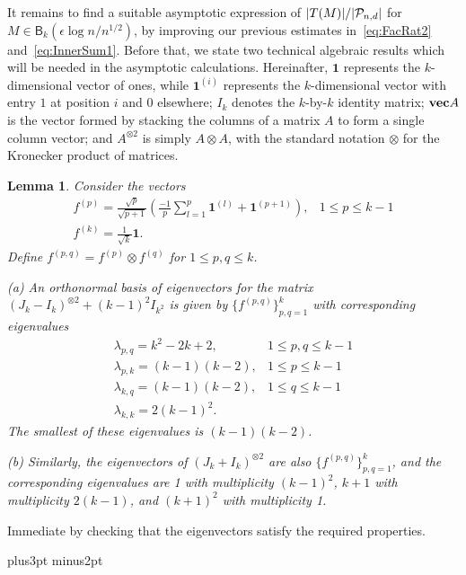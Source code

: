 \documentclass[12pt]{article}
\newcommand{\lab}[1]{\label{#1}}
\def\blackslug{\hbox{\kern1pt\vrule height6pt width4pt  depth1pt\kern1pt}}
\def\qed{\penalty 500\hbox{\quad\blackslug}\ifmmode\else\par
                                             \vskip4.5pt plus3pt minus2pt\fi}
\newtheorem{lemma}[thm]{Lemma}
\def\proof{\par\noindent{\bf Proof.\enspace}\rm}
\def\P{{\cal P}}
\def\Pnd{\P_{n,d}}
\def\mvec{{\bf vec}}
\def\onesvec{{\mathbf{1}}}
\newcommand{\B} {\ensuremath{\mathsf B}}
\begin{document}
It remains to find a suitable asymptotic expression of $|T(M)|/|\Pnd|$ for $M\in\B_k(\epsilon\log n/n^{1/2})$, by improving our previous estimates in~\eqref{eq:FacRat2} and~\eqref{eq:InnerSum1}.
%
Before that, we state two technical algebraic results which will be needed in the asymptotic calculations.
Hereinafter, $\onesvec$ represents the $k$-dimensional vector of ones,
while $\onesvec^{(i)}$ represents the $k$-dimensional vector with entry $1$ at position $i$ and $0$ elsewhere; $I_k$ denotes the $k$-by-$k$ identity matrix; $\mvec A$ is the vector formed by stacking the columns of a matrix $A$ to form a single column vector; and $A^{\otimes 2}$ is simply $A\otimes A$, with the standard notation $\otimes$ for the Kronecker product of matrices.
%
\begin{lemma}
\lab{lem:Evec2}
Consider the vectors
\[
\begin{array}{ll}
f^{(p)} = \frac{\sqrt{p}}{\sqrt{p+1}}\left(\frac{-1}{p}\sum_{l=1}^p\onesvec^{(l)}+\onesvec^{(p+1)}\right), & 1\le p \le k-1 \\
f^{(k)} = \frac{1}{\sqrt{k}}\onesvec. &
\end{array}
\]
Define $f^{(p,q)}=f^{(p)}\otimes f^{(q)}$ for $1\le p,q \le k$.
\begin{description}
\item{(a)}
An orthonormal basis of eigenvectors for the matrix 
$(J_k-I_k)^{\otimes 2}+(k-1)^2I_{k^2}$ is given by $\{f^{(p,q)}\}_{p,q=1}^k$ with corresponding eigenvalues
\[
\begin{array}{ll}
\lambda_{p,q} = k^2-2k+2,& 1\le p,q \le k-1 \\
\lambda_{p,k} = (k-1)(k-2),& 1\le p \le k-1 \\
\lambda_{k,q} = (k-1)(k-2),& 1\le q \le k-1 \\
\lambda_{k,k} = 2(k-1)^2.&
\end{array}
\]
The smallest of these eigenvalues is $(k-1)(k-2)$.
\item{(b)}
Similarly, the eigenvectors of $(J_k+I_k)^{\otimes 2}$ are also $\{f^{(p,q)}\}_{p,q=1}^k$, and the corresponding eigenvalues are
1 with multiplicity $(k-1)^2$,
$k+1$ with multiplicity $2(k-1)$,
and $(k+1)^2$ with multiplicity 1.
\end{description}
\end{lemma}
%
\proof Immediate by checking that the eigenvectors satisfy the required properties.
\qed
%
%
\end{document}
